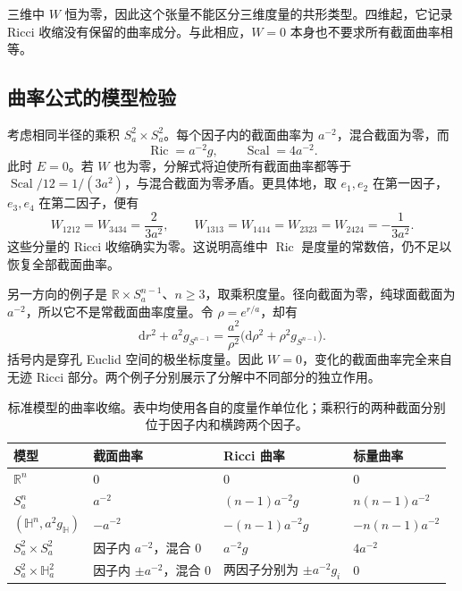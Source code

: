三维中 \(W\) 恒为零，因此这个张量不能区分三维度量的共形类型。四维起，它记录 Ricci 收缩没有保留的曲率成分。与此相应，\(W=0\) 本身也不要求所有截面曲率相等。

\subsection{曲率公式的模型检验}
\label{g3:subsec:0304:04}

考虑相同半径的乘积 \(S_a^2\times S_a^2\)。每个因子内的截面曲率为 \(a^{-2}\)，混合截面为零，而
\[
	\operatorname{Ric}=a^{-2}g,\qquad \operatorname{Scal}=4a^{-2}.
\]
此时 \(E=0\)。若 \(W\) 也为零，分解式将迫使所有截面曲率都等于 \(\operatorname{Scal}/12=1/(3a^2)\)，与混合截面为零矛盾。更具体地，取 \(e_1,e_2\) 在第一因子，\(e_3,e_4\) 在第二因子，便有
\[
	W_{1212}=W_{3434}=\frac{2}{3a^2},\qquad
	W_{1313}=W_{1414}=W_{2323}=W_{2424}=-\frac1{3a^2}.
\]
这些分量的 Ricci 收缩确实为零。这说明高维中 \(\operatorname{Ric}\) 是度量的常数倍，仍不足以恢复全部截面曲率。

\ProseParagraphBreak

另一方向的例子是 \(\mathbb R\times S_a^{n-1}\)、\(n\ge3\)，取乘积度量。径向截面为零，纯球面截面为 \(a^{-2}\)，所以它不是常截面曲率度量。令 \(\rho=e^{r/a}\)，却有
\[
	\mathrm dr^2+a^2g_{S^{n-1}}
	=\frac{a^2}{\rho^2}\bigl(\mathrm d\rho^2+\rho^2g_{S^{n-1}}\bigr).
\]
括号内是穿孔 Euclid 空间的极坐标度量。因此 \(W=0\)，变化的截面曲率完全来自无迹 Ricci 部分。两个例子分别展示了分解中不同部分的独立作用。

\begin{table}[htbp]
	\centering
	\caption[标准模型的曲率收缩]{标准模型的曲率收缩。表中均使用各自的度量作单位化；乘积行的两种截面分别位于因子内和横跨两个因子。}
	\label{g3:tab:curvature-model-checks}
	\begin{tabularx}{\textwidth}{@{}lXXX@{}}
		\toprule
		模型 & 截面曲率 & Ricci 曲率 & 标量曲率\\
		\midrule
		\(\mathbb R^n\) & \(0\) & \(0\) & \(0\)\\
		\(S_a^n\) & \(a^{-2}\) & \((n-1)a^{-2}g\) & \(n(n-1)a^{-2}\)\\
		\((\mathbb H^n,a^2g_{\mathbb H})\) & \(-a^{-2}\) & \(-(n-1)a^{-2}g\) & \(-n(n-1)a^{-2}\)\\
		\(S_a^2\times S_a^2\) & 因子内 \(a^{-2}\)，混合 \(0\) & \(a^{-2}g\) & \(4a^{-2}\)\\
		\(S_a^2\times\mathbb H_a^2\) & 因子内 \(\pm a^{-2}\)，混合 \(0\) & 两因子分别为 \(\pm a^{-2}g_i\) & \(0\)\\
		\bottomrule
	\end{tabularx}
\end{table}

